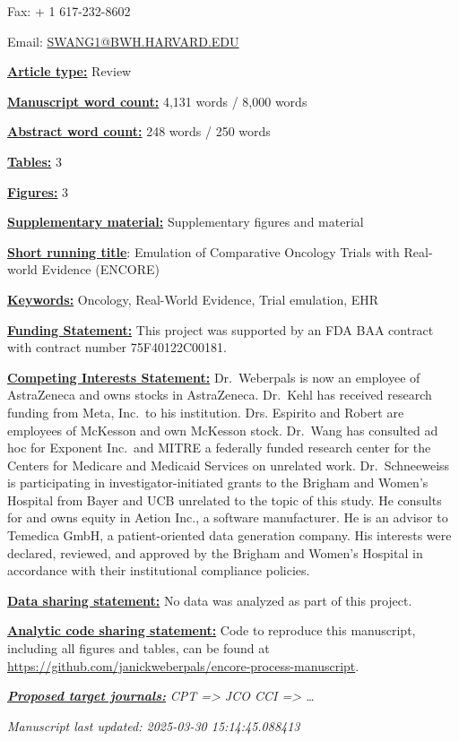 \documentclass[
  letterpaper,
  DIV=11,
  numbers=noendperiod]{scrartcl}
\begin{document}
Fax: + 1 617-232-8602

Email: \url{SWANG1@BWH.HARVARD.EDU}

\ul{\textbf{Article type:}} Review

\ul{\textbf{Manuscript word count:}} 4,131 words / 8,000 words

\ul{\textbf{Abstract word count:}} 248 words / 250 words

\ul{\textbf{Tables:}} 3

\ul{\textbf{Figures:}} 3

\ul{\textbf{Supplementary material:}} Supplementary figures and material

\ul{\textbf{Short running title}}: Emulation of Comparative Oncology
Trials with Real-world Evidence (ENCORE)

\ul{\textbf{Keywords:}} Oncology, Real-World Evidence, Trial emulation,
EHR

\ul{\textbf{Funding Statement:}} This project was supported by an FDA
BAA contract with contract number 75F40122C00181.

\ul{\textbf{Competing Interests Statement:}} Dr.~Weberpals is now an
employee of AstraZeneca and owns stocks in AstraZeneca. Dr.~Kehl has
received research funding from Meta, Inc.~to his institution. Drs.
Espirito and Robert are employees of McKesson and own McKesson stock.
Dr.~Wang has consulted ad hoc for Exponent Inc.~and MITRE a federally
funded research center for the Centers for Medicare and Medicaid
Services on unrelated work. Dr.~Schneeweiss is participating in
investigator-initiated grants to the Brigham and Women's Hospital from
Bayer and UCB unrelated to the topic of this study. He consults for and
owns equity in Aetion Inc., a software manufacturer. He is an advisor to
Temedica GmbH, a patient-oriented data generation company. His interests
were declared, reviewed, and approved by the Brigham and Women's
Hospital in accordance with their institutional compliance policies.

\ul{\textbf{Data sharing statement:}} No data was analyzed as part of
this project.

\ul{\textbf{Analytic code sharing statement:}} Code to reproduce this
manuscript, including all figures and tables, can be found at
\url{https://github.com/janickweberpals/encore-process-manuscript}.

\ul{\textbf{\emph{Proposed target journals:}}} \emph{CPT =\textgreater{}
JCO CCI =\textgreater{} \ldots{}}

\emph{Manuscript last updated: 2025-03-30 15:14:45.088413}
\end{document}
